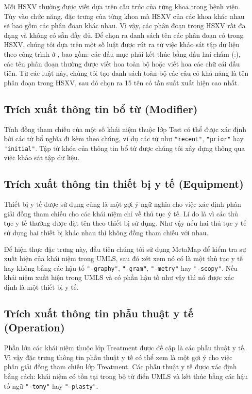 Mỗi HSXV thường được viết dựa trên cấu trúc của từng khoa trong bệnh viện. Tùy vào chức năng, đặc trưng của từng khoa mà HSXV của các khoa khác nhau sẽ bao gồm các phân đoạn khác nhau. Vì vậy, các phân đoạn trong HSXV rất đa dạng và không có sẵn đầy đủ. Để chọn ra danh sách tên các phân đoạn có trong HSXV, chúng tôi dựa trên một số luật được rút ra từ việc khảo sát tập dữ liệu theo công trình ở \cite{RandolphMiller2008}, bao gồm: các đầu mục phải kết thúc bằng dấu hai chấm (:), các tên phân đoạn thường được viết hoa toàn bộ hoặc viết hoa các chữ cái đầu tiên. Từ các luật này, chúng tôi tạo danh sách toàn bộ các câu có khả năng là tên phân đoạn trong HSXV, sau đó chọn ra 15 tên có tần suất xuất hiện cao nhất.

\subsection*{Trích xuất thông tin bổ từ (Modifier)}
Tính đồng tham chiếu của một số khái niệm thuộc lớp Test có thể được xác định bởi các từ bổ nghĩa đi kèm theo chúng, ví dụ các từ như \texttt{"recent"}, \texttt{"prior"} hay \texttt{"initial"}. Tập từ khóa của thông tin bổ từ được chúng tôi xây dựng thông qua việc khảo sát tập dữ liệu.

\subsection*{Trích xuất thông tin thiết bị y tế (Equipment)}
Thiết bị y tế được sử dụng cũng là một gợi ý ngữ nghĩa cho việc xác định phân giải đồng tham chiếu cho các khái niệm chỉ về thủ tục ý tế. Lí do là vì các thủ tục y tế thường được đặt tên theo thiết bị sử dụng. Như vậy nếu hai thủ tục y tế sử dụng hai thiết bị khác nhau thì không đồng tham chiếu với nhau. 

Để hiện thực đặc trưng này, đầu tiên chúng tôi sử dụng MetaMap để kiểm tra sự xuất hiện của khái niệm trong UMLS, sau đó xét xem nó có là một thủ tục y tế hay không bằng các hậu tố \texttt{"-graphy"}, \texttt{"-gram"}, \texttt{"-metry"} hay \texttt{"-scopy"}. Nếu khái niệm xuất hiện trong UMLS và có phần hậu tố như vậy thì nó được xác định là một thiết bị y tế.

\subsection*{Trích xuất thông tin phẫu thuật y tế (Operation)}
Phần lớn các khái niệm thuộc lớp Treatment được đề cập là các phẫu thuật y tế. Vì vậy đặc trưng thông tin phẫu thuật y tế có thể xem là một gợi ý cho việc phân giải đồng tham chiếu lớp Treatment. Các phẫu thuật y tế được xác định bằng cách: khái niệm có tồn tại trong bộ từ điển UMLS và kết thúc bằng các hậu tố ngữ \texttt{"-tomy"} hay \texttt{"-plasty"}.

